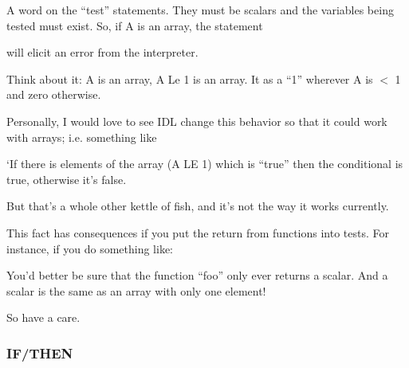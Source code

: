   A word on the ``test'' statements. They must be scalars and the
  variables being tested must exist. So, if A is an array, the
  statement


  will elicit an error from the interpreter.

  Think about it: A is an array, A Le 1 is  an array. It as
  a ``1'' wherever A is $<$ 1 and zero otherwise. 

  Personally, I would love to see IDL change this behavior so that it
  could work with arrays; i.e. something like 

   `If there is  elements of the array (A LE 1) which is
  ``true'' then the conditional is true, otherwise it's false. 


  But that's a whole other kettle of fish, and it's not the way it
  works currently.

  This fact has consequences if you put the return from functions
  into tests. For instance, if you do something like:


  You'd better be sure that the function ``foo'' only ever returns a
  scalar. And a scalar is  the same as an array with only
  one element!

  So have a care.


  \subsubsection{IF/THEN}\label{sec:qs-If-Then}

